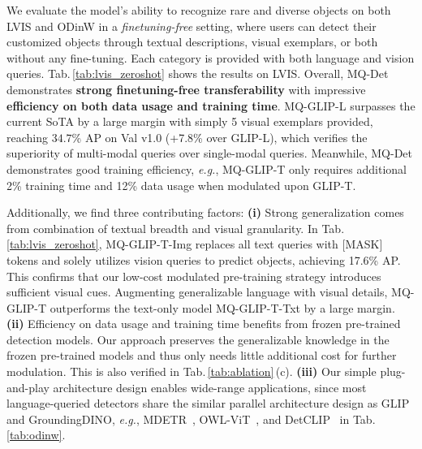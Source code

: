 We evaluate the model’s ability to recognize rare and diverse objects on both LVIS and ODinW in a \textit{finetuning-free} setting, where users can detect their customized objects through textual descriptions, visual exemplars, or both without any fine-tuning.
Each category is provided with both language and vision queries.
Tab.\,\ref{tab:lvis_zeroshot} shows the results on LVIS. 
Overall, MQ-Det demonstrates \textbf{strong finetuning-free transferability} with impressive \textbf{efficiency on both data usage and training time}. 
MQ-GLIP-L surpasses the current SoTA by a large margin with simply 5 visual exemplars provided, reaching $34.7$\% AP on Val v1.0 (+7.8\% over GLIP-L), which verifies the superiority of multi-modal queries over single-modal queries. 
Meanwhile, MQ-Det demonstrates good training efficiency, \emph{e.g.}, MQ-GLIP-T only requires additional 2\% training time and 12\% data usage when modulated upon GLIP-T. 


Additionally, we ﬁnd three contributing factors: 
\textbf{(i)} Strong generalization comes from combination of textual breadth and visual granularity.
In Tab.\,\ref{tab:lvis_zeroshot}, MQ-GLIP-T-Img replaces all text queries with [MASK] tokens and solely utilizes vision queries to predict objects, achieving 17.6\% AP. This confirms that our low-cost modulated pre-training strategy introduces sufficient visual cues.
Augmenting generalizable language with visual details, MQ-GLIP-T outperforms the text-only model MQ-GLIP-T-Txt by a large margin.
\textbf{(ii)} Efficiency on data usage and training time benefits from frozen pre-trained detection models. Our approach preserves the generalizable knowledge in the frozen pre-trained models and thus only needs little additional cost for further modulation. This is also verified in Tab.\,\ref{tab:ablation}\,(c).
\textbf{(iii)} Our simple plug-and-play architecture design enables wide-range applications, since most language-queried detectors share the similar parallel architecture design as GLIP and GroundingDINO, \emph{e.g.}, MDETR~\cite{mdetr}, OWL-ViT~\cite{owl-vit}, and DetCLIP~\cite{yao2023detclipv2} in Tab.\,\ref{tab:odinw}. 






